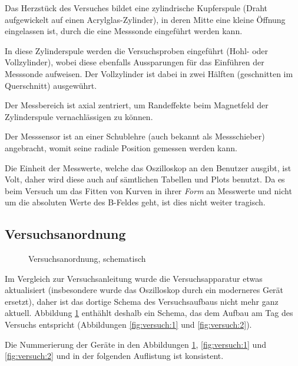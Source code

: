 Das  Herzst\"uck des  Versuches  bildet eine  zylindrische Kupferspule  (Draht
aufgewickelt  auf  einen  Acrylglas-Zylinder),  in  deren  Mitte  eine  kleine
\"Offnung eingelassen ist, durch die eine Messsonde eingef\"uhrt werden kann.

In  diese Zylinderspule  werden  die Versuchsproben  eingef\"uhrt (Hohl-  oder
Vollzylinder), wobei  diese ebenfalls  Aussparungen f\"ur das  Einf\"uhren der
Messsonde aufweisen. Der Vollzylinder ist dabei in zwei H\"alften (geschnitten
im Querschnitt) ausgew\"uhrt.

Der  Messbereich  ist axial  zentriert,  um  Randeffekte beim  Magnetfeld  der
Zylinderspule vernachl\"assigen zu k\"onnen.

Der  Messsensor  ist  an  einer Schublehre  (auch  bekannt  als  Messschieber)
angebracht, womit seine radiale Position gemessen werden kann.

Die Einheit der Messwerte, welche das Oszilloskop an den Benutzer ausgibt, ist
Volt, daher wird diese auch auf s\"amtlichen Tabellen und Plots benutzt. Da es
beim Versuch  um das Fitten von  Kurven in ihrer \emph{Form}  an Messwerte und
nicht  um  die absoluten  Werte  des  B-Feldes  geht,  ist dies  nicht  weiter
tragisch.


\subsection{Versuchsanordnung}
\label{sec:durchf:subsec:anordn}

\begin{figure}[!htb]
    \resizebox{\textwidth}{!}{}
    \caption{Versuchsanordnung, schematisch}
    \label{fig:versuch:schematic}
\end{figure}

Im  Vergleich   zur  Versuchsanleitung   wurde  die   Versuchsapparatur  etwas
aktualisiert (insbesondere wurde das  Oszilloskop durch ein moderneres Ger\"at
ersetzt), daher  ist das  dortige Schema des  Versuchsaufbaus nicht  mehr ganz
aktuell. Abbildung \ref{fig:versuch:schematic} enth\"ahlt  deshalb ein Schema,
das dem Aufbau am Tag des Versuchs entspricht (Abbildungen \ref{fig:versuch:1}
und \ref{fig:versuch:2}).

Die Nummerierung der Ger\"ate  in den Abbildungen \ref{fig:versuch:schematic},
\ref{fig:versuch:1} und  \ref{fig:versuch:2} und  in der  folgenden Auflistung
ist konsistent.

